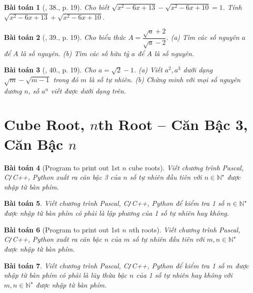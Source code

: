 \documentclass{article}
\newtheorem{baitoan}{Bài toán}
\begin{document}
\begin{baitoan}[\cite{Binh_Toan_9_tap_1}, 38., p. 19]
	Cho biết $\sqrt{x^2 - 6x + 13} - \sqrt{x^2 - 6x + 10} = 1$. Tính $\sqrt{x^2 - 6x + 13} + \sqrt{x^2 - 6x + 10}$.
\end{baitoan}

\begin{baitoan}[\cite{Binh_Toan_9_tap_1}, 39., p. 19]
	Cho biểu thức $A = \dfrac{\sqrt{a} + 2}{\sqrt{a} - 2}$. (a) Tìm các số nguyên $a$ để $A$ là số nguyên. (b) Tìm các số hữu tỷ $a$ để $A$ là số nguyên.
\end{baitoan}

\begin{baitoan}[\cite{Binh_Toan_9_tap_1}, 40., p. 19]
	Cho $a = \sqrt{2} - 1$. (a) Viết $a^2,a^3$ dưới dạng $\sqrt{m} - \sqrt{m - 1}$ trong đó $m$ là số tự nhiên. (b) Chứng minh với mọi số nguyên dương $n$, số $a^n$ viết được dưới dạng trên.
\end{baitoan}


\section{Cube Root, $n$th Root -- Căn Bậc 3, Căn Bậc $n$}

\begin{baitoan}[Program to print out 1st $n$ cube roots]
	Viết chương trình {\sf Pascal, C\texttt{/}C++, Python} xuất ra căn bậc 3 của $n$ số tự nhiên đầu tiên với $n\in\mathbb{N}^\star$ được nhập từ bàn phím.
\end{baitoan}

\begin{baitoan}
	Viết chương trình {\sf Pascal, C\texttt{/}C++, Python} để kiểm tra 1 số $n\in\mathbb{N}^\star$ được nhập từ bàn phím có phải là lập phương của 1 số tự nhiên hay không.
\end{baitoan}

\begin{baitoan}[Program to print out 1st $n$ $n$th roots]
	Viết chương trình {\sf Pascal, C\texttt{/}C++, Python} xuất ra căn bậc $n$ của $m$ số tự nhiên đầu tiên với $m,n\in\mathbb{N}^\star$ được nhập từ bàn phím.
\end{baitoan}

\begin{baitoan}
	Viết chương trình {\sf Pascal, C\texttt{/}C++, Python} để kiểm tra 1 số $m$ được nhập từ bàn phím có phải là lũy thừa bậc $n$ của 1 số tự nhiên hay không với $m,n\in\mathbb{N}^\star$ được nhập từ bàn phím.
\end{baitoan}
\end{document}
